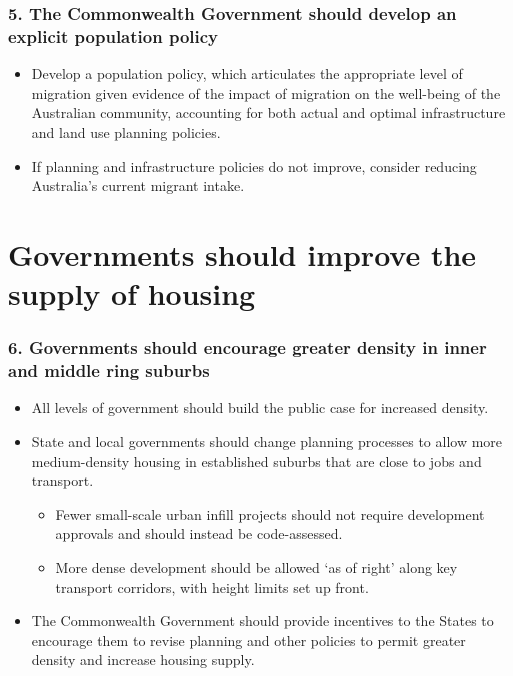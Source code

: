 \documentclass[FrontPage]{grattan}
\begin{document}
\subsubsection{5. The Commonwealth Government should develop an explicit population policy}
\begin{itemize}
\item Develop a population policy, which articulates the appropriate level of migration given evidence of the impact of migration on the well-being of the Australian community, accounting for both actual and optimal infrastructure and land use planning policies. 
\item If planning and infrastructure policies do not improve, consider reducing Australia's current migrant intake.  
\end{itemize}


\pagebreak
\section*{Governments should improve the supply of housing}
\subsubsection{6. Governments should encourage greater density in inner and middle ring suburbs}
\begin{itemize}
\item All levels of government should build the public case for increased density. 
\item State and local governments should change planning processes to allow more medium-density housing in established suburbs that are close to jobs and transport.
\begin{itemize}
    \item Fewer small-scale urban infill projects should not require development approvals and should instead be code-assessed.
    \item More dense development should be allowed `as of right' along key transport corridors, with height limits set up front.
\end{itemize}
\item The Commonwealth Government should provide incentives to the States to encourage them to revise planning and other policies to permit greater density and increase housing supply.
\end{itemize}
\end{document}
